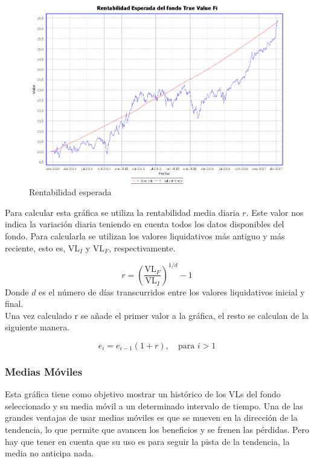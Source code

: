 \documentclass[12pt, a4paper]{book}
\begin{document}
	\begin{figure}[htbp]
	\centering
	\includegraphics[width=\textwidth]{figuras/esperada.PNG}
	\caption{Rentabilidad esperada}
	\label{fig:esperada}
	\end {figure}

Para calcular esta gráfica se utiliza la rentabilidad media diaria $r$. Este valor nos indica la variación diaria teniendo en cuenta todos los datos disponibles del fondo. Para calcularla se utilizan los valores liquidativos más antiguo y más reciente, esto es, $\text{VL}_I$ y $\text{VL}_F$, respectivamente.

\begin{equation}
r=\left(\frac{\text{VL}_F}{\text{VL}_I}\right)^{1/d}-1
\end{equation} 
Donde $d$ es el número de días transcurridos entre los valores liquidativos inicial y final.\\

Una vez calculado r se añade el primer valor a la gráfica, el resto se calculan de la siguiente manera.

\begin{equation}
e_i= e_{i-1} \left(1 + r\right), \quad\text{para }i>1
\end{equation} 



\newpage

\subsubsection{Medias Móviles}

Esta gráfica tiene como objetivo mostrar un histórico de los \gls{VL}s del fondo seleccionado y su media móvil a un determinado intervalo de tiempo. Una de las grandes ventajas de usar medias móviles es que se mueven en la dirección de la tendencia, lo que permite que avancen los beneficios y se frenen las pérdidas. Pero hay que tener en cuenta que su uso es para seguir la pista de la tendencia, la media no anticipa nada.
\end{document}
